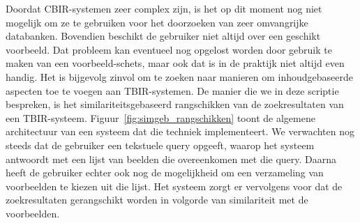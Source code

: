 Doordat CBIR-systemen zeer complex zijn, is het op dit moment nog niet mogelijk om ze te gebruiken voor het 
doorzoeken van zeer omvangrijke databanken. Bovendien beschikt de gebruiker niet altijd over
een geschikt voorbeeld. Dat probleem kan eventueel nog opgelost worden door gebruik
te maken van een voorbeeld-schets, maar ook dat is in de praktijk niet altijd even handig.
Het is bijgevolg zinvol om te zoeken naar manieren om inhoudgebaseerde aspecten toe te voegen aan
TBIR-systemen. De manier die we in deze scriptie bespreken, is het 
similariteitsgebaseerd rangschikken van de zoekresultaten van een TBIR-systeem. 
Figuur~\ref{fig:simgeb_rangschikken} toont de algemene architectuur van een systeem
dat die techniek implementeert. We verwachten
nog steeds dat de gebruiker een tekstuele query opgeeft, waarop het systeem antwoordt met een 
lijst van beelden die overeenkomen met die query. Daarna heeft de gebruiker echter ook nog 
de mogelijkheid om een verzameling van voorbeelden te kiezen uit die lijst. Het 
systeem zorgt er vervolgens voor dat de zoekresultaten gerangschikt worden in 
volgorde van similariteit met de voorbeelden.

